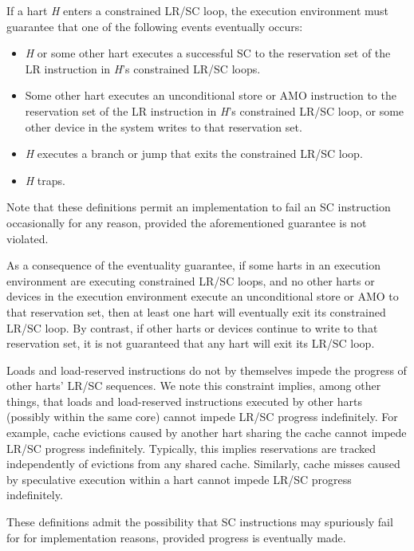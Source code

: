 If a hart {\em H} enters a constrained LR/SC loop, the execution environment
must guarantee that one of the following events eventually occurs:
\vspace{-0.2in}
\begin{itemize}
\parskip 0pt
\itemsep 1pt
\item {\em H} or some other hart executes a successful SC to the reservation
  set of the LR instruction in {\em H}'s constrained LR/SC loops.
\item Some other hart executes an unconditional store or AMO instruction to
  the reservation set of the LR instruction in {\em H}'s constrained LR/SC
  loop, or some other device in the system writes to that reservation set.
\item {\em H} executes a branch or jump that exits the constrained LR/SC loop.
\item {\em H} traps.
\end{itemize}

\begin{commentary}
Note that these definitions permit an implementation to fail an SC instruction
occasionally for any reason, provided the aforementioned guarantee is not
violated.
\end{commentary}

\begin{commentary}
As a consequence of the eventuality guarantee, if some harts in an execution
environment are executing constrained LR/SC loops, and no other harts or
devices in the execution environment execute an unconditional store or AMO to
that reservation set, then at least one hart will eventually exit its
constrained LR/SC loop.
By contrast, if other harts or devices continue to write to that reservation
set, it is not guaranteed that any hart will exit its LR/SC loop.

Loads and load-reserved instructions do not by themselves impede the progress
of other harts' LR/SC sequences.
We note this constraint implies, among other things, that loads and
load-reserved instructions executed by other harts (possibly within the same
core) cannot impede LR/SC progress indefinitely.
For example, cache evictions caused by another hart sharing the cache cannot
impede LR/SC progress indefinitely.
Typically, this implies reservations are tracked independently of
evictions from any shared cache.
Similarly, cache misses caused by speculative execution within a hart cannot
impede LR/SC progress indefinitely.

These definitions admit the possibility that SC instructions may spuriously
fail for for implementation reasons, provided progress is eventually made.
\end{commentary}

